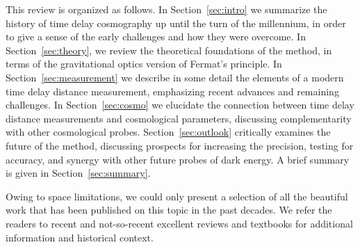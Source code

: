 This review is organized as follows. In Section~\ref{sec:intro} we
summarize the history of time delay cosmography up until the turn of
the millennium, in order to give a sense of the early challenges and
how they were overcome. In Section~\ref{sec:theory}, we review the
theoretical foundations of the method, in terms of the gravitational
optics version of Fermat's principle. In Section~\ref{sec:measurement}
we describe in some detail the elements of a modern time delay
distance measurement, emphasizing recent advances and remaining
challenges. In Section~\ref{sec:cosmo} we elucidate the connection
between time delay distance measurements and cosmological parameters,
discussing complementarity with other cosmological
probes. Section~\ref{sec:outlook} critically examines the future of
the method, discussing prospects for increasing the precision, testing
for accuracy, and synergy with other future probes of dark energy. A
brief summary is given in Section~\ref{sec:summary}. 

Owing to space limitations, we could only present a selection of all
the beautiful work that has been published on this topic in the past
decades. We refer the readers to recent
\citep{Bar10,Ell10,Tre10,TMC12,Jackson:2013p30763,Jac15,T+E15} and not-so-recent \citep{B+N92,CSS02,K+S04,Fal05,SKW06}
excellent reviews and textbooks \citep{SEF92} for additional
information and historical context.

